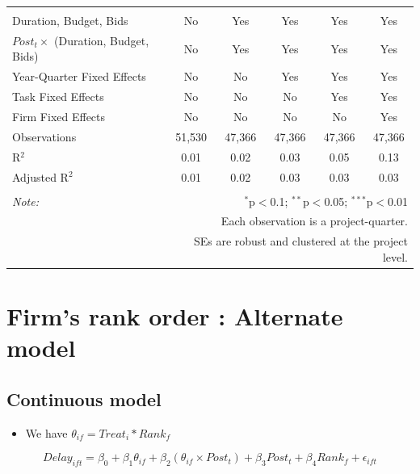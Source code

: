 \documentclass[
]{article}
\providecommand{\tightlist}{%
  \setlength{\itemsep}{0pt}\setlength{\parskip}{0pt}}
\begin{document}
\begin{table}[H]
\begin{tabular}{@{\extracolsep{-2pt}}lccccc}
  & & & & & \\ 
\hline \\[-1.8ex] 
Duration, Budget, Bids & No & Yes & Yes & Yes & Yes \\ 
$Post_t \times$  (Duration, Budget, Bids) & No & Yes & Yes & Yes & Yes \\ 
Year-Quarter Fixed Effects & No & No & Yes & Yes & Yes \\ 
Task Fixed Effects & No & No & No & Yes & Yes \\ 
Firm Fixed Effects & No & No & No & No & Yes \\ 
Observations & 51,530 & 47,366 & 47,366 & 47,366 & 47,366 \\ 
R$^{2}$ & 0.01 & 0.02 & 0.03 & 0.05 & 0.13 \\ 
Adjusted R$^{2}$ & 0.01 & 0.02 & 0.03 & 0.03 & 0.03 \\ 
\hline 
\hline \\[-1.8ex] 
\textit{Note:}  & \multicolumn{5}{r}{$^{*}$p$<$0.1; $^{**}$p$<$0.05; $^{***}$p$<$0.01} \\ 
 & \multicolumn{5}{r}{Each observation is a project-quarter.} \\ 
 & \multicolumn{5}{r}{SEs are robust and clustered at the project level.} \\ 
\end{tabular} 
\end{table}

\hypertarget{firms-rank-order-alternate-model}{%
\section{Firm's rank order : Alternate
model}\label{firms-rank-order-alternate-model}}

\hypertarget{continuous-model}{%
\subsection{Continuous model}\label{continuous-model}}

\begin{itemize}
\tightlist
\item
  We have \(\theta_{if} = Treat_i * Rank_f\)
\end{itemize}

\[ Delay_{ift} = \beta_0 + \beta_1 \theta_{if} + \beta_2 (\theta_{if} \times Post_t) + \beta_3 Post_t + \beta_4 Rank_f + \epsilon_{ift} \]
\end{document}
